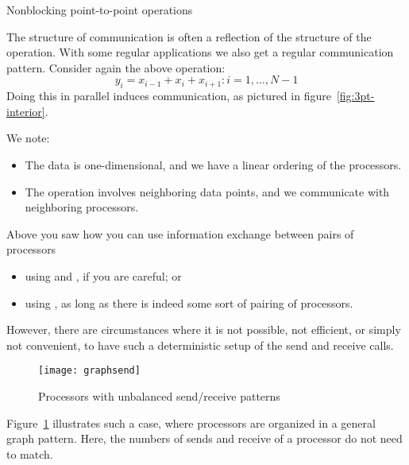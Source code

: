 
 {Nonblocking point-to-point operations}
\label{sec:nonblock}

The structure of communication is often a reflection of the structure
of the operation.
With some regular applications we also get a regular communication pattern.
Consider again the above operation:
\[ y_i=x_{i-1}+x_i+x_{i+1}\colon i=1,\ldots,N-1 \]
Doing this in parallel induces communication, as pictured in figure~\ref{fig:3pt-interior}.


We note:
\begin{itemize}
\item The data is one-dimensional, and we have a linear ordering of the processors.
\item The operation involves neighboring data points, and we communicate
  with neighboring processors.
\end{itemize}

Above you saw how you can use information exchange between pairs of processors
\begin{itemize}
\item using  and , if you are careful; or
\item using , as long as there is indeed some sort of pairing of processors.
\end{itemize}
However, there are circumstances where it is not possible, not efficient, or simply not
convenient, to have such a deterministic setup of the send and receive calls.
%
\begin{figure}[ht]
  \texttt{[image: graphsend]}
  \caption{Processors with unbalanced send/receive patterns}
  \label{fig:graphsend}
\end{figure}
%
Figure~\ref{fig:graphsend} illustrates such a case, where processors are
organized in a general graph pattern. Here, the numbers of sends and receive
of a processor do not need to match.


